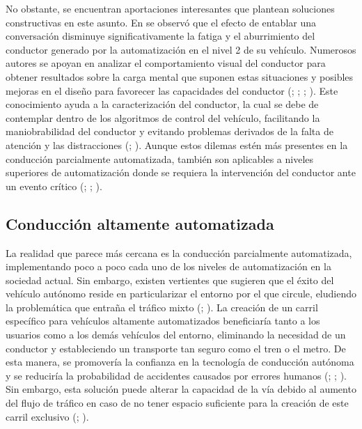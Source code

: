 No obstante, se encuentran aportaciones interesantes que plantean soluciones constructivas en este asunto. En \textcite{lee19} se observó que el efecto de entablar una conversación disminuye significativamente la fatiga y el aburrimiento del conductor generado por la automatización en el nivel 2 de su vehículo. Numerosos autores se apoyan en analizar el comportamiento visual del conductor para obtener resultados sobre la carga mental que suponen estas situaciones y posibles mejoras en el diseño para favorecer las capacidades del conductor (\cite{forster}; \cite{chen}; \cite{ulahannan}; \cite{goncalves}). Este conocimiento ayuda a la caracterización del conductor, la cual se debe de contemplar dentro de los algoritmos de control del vehículo, facilitando la maniobrabilidad del conductor y evitando problemas derivados de la falta de atención y las distracciones (\cite{ahlstrom}; \cite{cunningham}). Aunque estos dilemas estén más presentes en la conducción parcialmente automatizada, también son aplicables a niveles superiores de automatización donde se requiera la intervención del conductor ante un evento crítico (\cite{jimenez18}; \cite{morales}; \cite{merlhiot}).

\subsection{Conducción altamente automatizada}
La realidad que parece más cercana es la conducción parcialmente automatizada, implementando poco a poco cada uno de los niveles de automatización en la sociedad actual. Sin embargo, existen vertientes que sugieren que el éxito del vehículo autónomo reside en particularizar el entorno por el que circule, eludiendo la problemática que entraña el tráfico mixto (\cite{ma}; \cite{zhang20}). La creación de un carril específico para vehículos altamente automatizados beneficiaría tanto a los usuarios como a los demás vehículos del entorno, eliminando la necesidad de un conductor y estableciendo un transporte tan seguro como el tren o el metro. De esta manera, se promovería la confianza en la tecnología de conducción autónoma y se reduciría la probabilidad de accidentes causados por errores humanos (\cite{nickkar}; \cite{zhang20}; \cite{sohrabi}). Sin embargo, esta solución puede alterar la capacidad de la vía debido al aumento del flujo de tráfico en caso de no tener espacio suficiente para la creación de este carril exclusivo (\cite{ghanipoor}; \cite{santana}).


